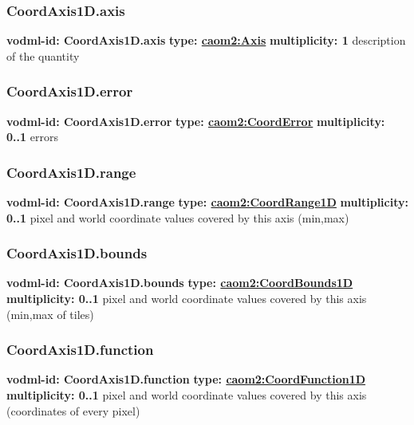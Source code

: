     \subsubsection{CoordAxis1D.axis}
      \textbf{vodml-id: CoordAxis1D.axis} \newline
      \textbf{type: \hyperref[sect:Axis]{caom2:Axis}} \newline
      \textbf{multiplicity: 1} \newline
      description of the quantity

    \subsubsection{CoordAxis1D.error}
      \textbf{vodml-id: CoordAxis1D.error} \newline
      \textbf{type: \hyperref[sect:CoordError]{caom2:CoordError}} \newline
      \textbf{multiplicity: 0..1} \newline
      errors

    \subsubsection{CoordAxis1D.range}
      \textbf{vodml-id: CoordAxis1D.range} \newline
      \textbf{type: \hyperref[sect:CoordRange1D]{caom2:CoordRange1D}} \newline
      \textbf{multiplicity: 0..1} \newline
      pixel and world coordinate values covered by this axis (min,max)

    \subsubsection{CoordAxis1D.bounds}
      \textbf{vodml-id: CoordAxis1D.bounds} \newline
      \textbf{type: \hyperref[sect:CoordBounds1D]{caom2:CoordBounds1D}} \newline
      \textbf{multiplicity: 0..1} \newline
      pixel and world coordinate values covered by this axis (min,max of tiles)

    \subsubsection{CoordAxis1D.function}
      \textbf{vodml-id: CoordAxis1D.function} \newline
      \textbf{type: \hyperref[sect:CoordFunction1D]{caom2:CoordFunction1D}} \newline
      \textbf{multiplicity: 0..1} \newline
      pixel and world coordinate values covered by this axis (coordinates of every pixel)

